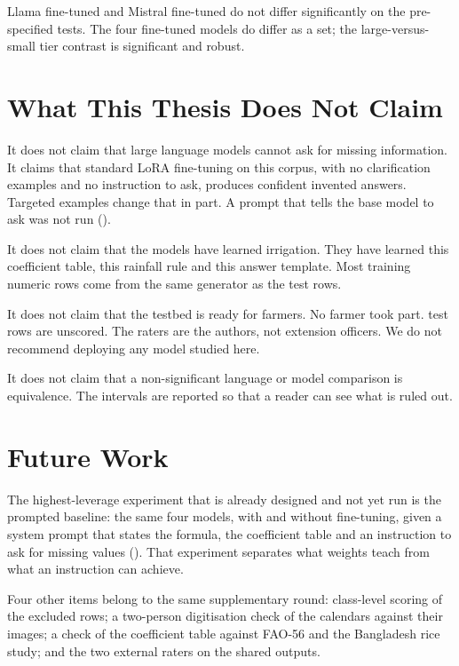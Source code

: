 Llama fine-tuned and Mistral fine-tuned do not differ significantly on the pre-specified tests. The four fine-tuned models do differ as a set; the large-versus-small tier contrast is significant and robust.

\section{What This Thesis Does Not Claim}
\label{sec:does-not-claim}

It does not claim that large language models cannot ask for missing information. It claims that standard LoRA fine-tuning on this corpus, with no clarification examples and no instruction to ask, produces confident invented answers. Targeted examples change that in part. A prompt that tells the base model to ask was not run ().

It does not claim that the models have learned irrigation. They have learned this coefficient table, this rainfall rule and this answer template. Most training numeric rows come from the same generator as the test rows.

It does not claim that the testbed is ready for farmers. No farmer took part. \TestExcluded test rows are unscored. The raters are the authors, not extension officers. We do not recommend deploying any model studied here.

It does not claim that a non-significant language or model comparison is equivalence. The intervals are reported so that a reader can see what is ruled out.

\section{Future Work}
\label{sec:future}

The highest-leverage experiment that is already designed and not yet run is the prompted baseline: the same four models, with and without fine-tuning, given a system prompt that states the formula, the coefficient table and an instruction to ask for missing values (). That experiment separates what weights teach from what an instruction can achieve.

Four other items belong to the same supplementary round: class-level scoring of the \TestExcluded excluded rows; a two-person digitisation check of the calendars against their images; a check of the coefficient table against FAO-56 and the Bangladesh rice study; and the two external raters on the shared outputs.

